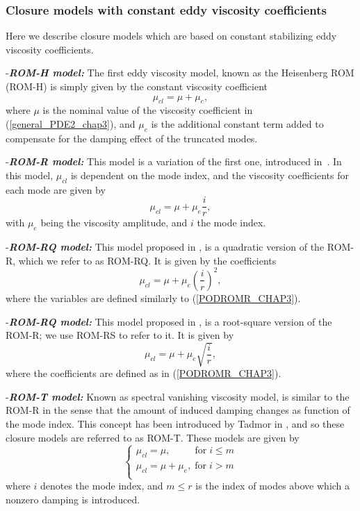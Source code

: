 \documentclass[letterpaper,conference,onecolumn,11pt]{IEEEtran}
\begin{document}
\subsubsection{Closure models with constant eddy
viscosity coefficients} Here we describe closure models which are
based on constant stabilizing eddy viscosity coefficients.

  {-\bf\it ROM-H model:} The first eddy
viscosity model, known as the Heisenberg ROM (ROM-H) is simply
given by the constant viscosity coefficient
\begin{equation}\label{PODROMH_CHAP3}
\mu_{cl}=\mu+\mu_{e},
\end{equation}
where $\mu$ is the nominal value of the viscosity coefficient in
(\ref{general_PDE2_chap3}), and $\mu_{e}$ is the additional
constant term added to compensate for the damping effect of the
truncated modes.

{-\bf\it ROM-R model:} This model is a variation of the first one,
introduced in~\cite{R91}. In this model, $\mu_{cl}$ is dependent
on the mode index, and the viscosity coefficients for each mode
are given by
\begin{equation}\label{PODROMR_CHAP3}
\mu_{cl}=\mu+\mu_{e}\frac{i}{r},
\end{equation}
with $\mu_{e}$ being the viscosity amplitude, and $i$ the mode
index.

{-\bf\it ROM-RQ model:} This model proposed in \cite{SI13}, is a
quadratic version of the ROM-R, which we refer to as ROM-RQ. It is
given by the coefficients
\begin{equation}\label{PODROMRQ_CHAP3}
\mu_{cl}=\mu+\mu_{e}\left ( \frac{i}{r} \right ) ^{2},
\end{equation}
where the variables are defined similarly to
(\ref{PODROMR_CHAP3}).

{-\bf\it ROM-RQ model:} This model proposed in \cite{SI13}, is a
root-square version of the ROM-R; we use ROM-RS to refer to it. It
is given by
\begin{equation}\label{PODROMRS_CHAP3}
\mu_{cl}=\mu+\mu_{e}\sqrt{\frac{i}{r}},
\end{equation}
where the coefficients are defined as in (\ref{PODROMR_CHAP3}).

{-\bf\it ROM-T model:} Known as spectral vanishing viscosity
model, is similar to the ROM-R in the sense that the amount of
induced damping changes as function of the mode index. This
concept has been introduced by Tadmor in \cite{T89}, and so these
closure models are referred to as ROM-T. These models are given by
\begin{equation}\label{PODROMRT_CHAP3}
\left\{\begin{array}{l} \mu_{cl}=\mu,\;\;\;\;\;\;\;\;\;\text{for} \;i \leq m\\
\mu_{cl}=\mu+\mu_{e},\;\text{for}\;i>  m\\
\end{array}\right.
\end{equation}
where $i$ denotes the mode index, and $m\leq r$ is the index of
modes above which a nonzero damping is introduced.
\end{document}
